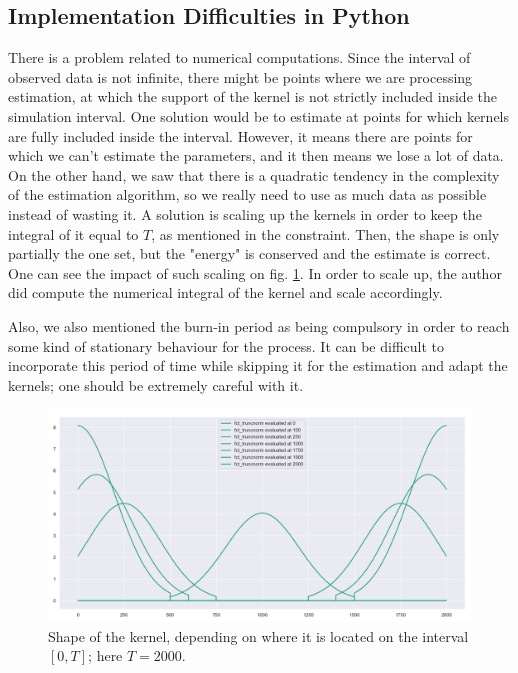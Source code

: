 \subsection{Implementation Difficulties in Python}
There is a problem related to numerical computations. Since the interval of observed data is not infinite, there might be points where we are processing estimation, at which the support of the kernel is not strictly included inside the simulation interval. One solution would be to estimate at points for which kernels are fully included inside the interval. However, it means there are points for which we can't estimate the parameters, and it then means we lose a lot of data. On the other hand, we saw that there is a quadratic tendency in the complexity of the estimation algorithm, so we really need to use as much data as possible instead of wasting it. A solution is scaling up the kernels in order to keep the integral of it equal to $T$, as mentioned in the constraint. Then, the shape is only partially the one set, but the "energy" is conserved and the estimate is correct. One can see the impact of such scaling on fig. \ref{fig:scaling_kernels}. In order to scale up, the author did compute the numerical integral of the kernel and scale accordingly.

Also, we also mentioned the burn-in period as being compulsory in order to reach some kind of stationary behaviour for the process. It can be difficult to incorporate this period of time while skipping it for the estimation and adapt the kernels; one should be extremely careful with it.



\begin{figure}
\centering
\includegraphics[width = 0.90 \textwidth]{../imag/chap2/impact_edge_kernel.png}
\caption{Shape of the kernel, depending on where it is located on the interval $[0,T]$; here $T = 2000$.}
\label{fig:scaling_kernels}
\end{figure}




